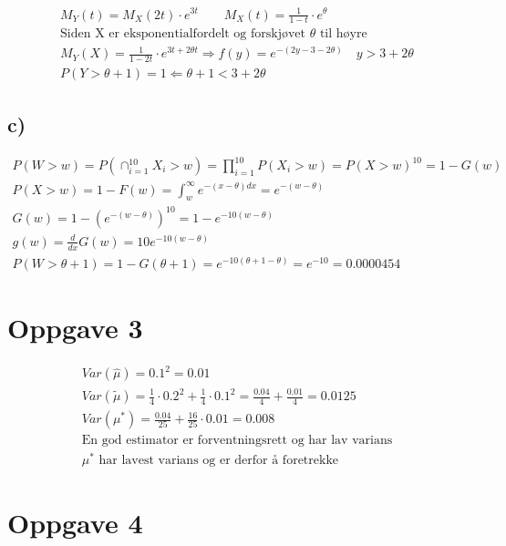 \begin{gather*}
	M_Y(t) = M_X(2 t) \cdot e^{3 t}
	\qquad
	M_X(t) = \frac{1}{1 - t} \cdot e^{\theta}
	\\
	\text{Siden X er eksponentialfordelt og forskjøvet } \theta \text{ til høyre}
	\\
	M_Y(X) = \frac{1}{1 - 2 t} \cdot e^{3 t + 2 \theta t} \Rightarrow f(y) = e^{-(2 y - 3 - 2 \theta)}	\quad y > 3 + 2 \theta
	\\
	P(Y > \theta + 1) = 1 \Leftarrow \theta + 1 < 3 + 2 \theta
\end{gather*}


\subsection*{c)}

\begin{gather*}
	P(W > w) = P(\cap_{i = 1}^{10}{X_i > w}) = \prod_{i = 1}^{10}{P(X_i > w)} = P(X > w)^{10} = 1 - G(w)
	\\
	P(X > w) = 1 - F(w) = \int_w^\infty{e^{-(x - \theta) dx}} = e^{-(w - \theta)}
	\\
	G(w) = 1 - \left(e^{-(w - \theta)}\right)^{10} = 1 - e^{-10 (w - \theta)}
	\\
	g(w) = \frac{d}{dx} G(w) = 10 e^{-10 (w - \theta)}
	\\
	P(W > \theta + 1) = 1 - G(\theta + 1) = e^{-10 (\theta + 1 - \theta)} = e^{-10} = 0.0000454
\end{gather*}


\section*{Oppgave 3}


\begin{gather*}
	Var(\hat \mu) = 0.1^2 = 0.01
	\\
	Var(\tilde \mu) = \frac{1}{4} \cdot 0.2^2 + \frac{1}{4} \cdot 0.1^2
	=
	\frac{0.04}{4} + \frac{0.01}{4} = 0.0125
	\\
	Var(\mu^*) = \frac{0.04}{25} + \frac{16}{25} \cdot 0.01 = 0.008
	\\
	\text{En god estimator er forventningsrett og har lav varians}
	\\
	\mu^* \text{ har lavest varians og er derfor å foretrekke}
\end{gather*}


\section*{Oppgave 4}


